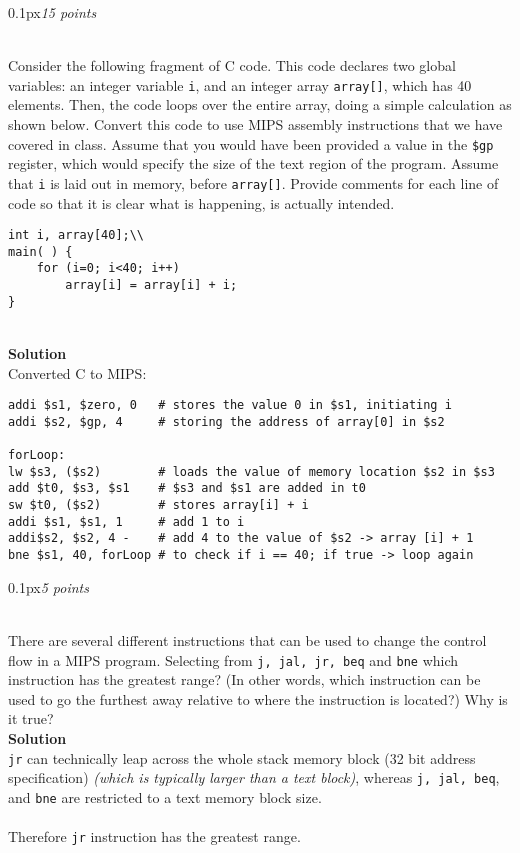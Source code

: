 \documentclass[11pt]{article}
\newcommand{\problem}[2]{\begin{adjustwidth}{0.1px}\noindent \framebox[1.2\width]{\large Problem #1}\hfill \emph{#2} \end{adjustwidth} \bigskip\\}
\newcommand{\code}[1]{{\texttt{#1}}}
\begin{document}
\newpage
\problem{2}{15 points}
Consider the following fragment of C code. This code declares two global variables: an integer variable \code{i}, and an integer array \code{array[]}, which has 40 elements. Then, the code loops over the entire array, doing a simple calculation as shown below. Convert this code to use MIPS assembly instructions that we have covered in class. Assume that you would have been provided a value in the \code{\$gp} register, which would specify the size of the text region of the program. Assume that \code{i} is laid out in memory, before \code{array[]}. Provide comments for each line of code so that it is clear what is happening, is actually intended.
\begin{lstlisting}[style=c]
int i, array[40];\\
main( ) { 
	for (i=0; i<40; i++) 
    	array[i] = array[i] + i; 
} 
\end{lstlisting}
\bigskip \\
\textbf{Solution}\\
Converted C to MIPS:
\begin{lstlisting}[style=MIPS]
addi $s1, $zero, 0   # stores the value 0 in $s1, initiating i
addi $s2, $gp, 4     # storing the address of array[0] in $s2

forLoop:
lw $s3, ($s2)        # loads the value of memory location $s2 in $s3
add $t0, $s3, $s1    # $s3 and $s1 are added in t0
sw $t0, ($s2)        # stores array[i] + i
addi $s1, $s1, 1     # add 1 to i
addi$s2, $s2, 4 -    # add 4 to the value of $s2 -> array [i] + 1
bne $s1, 40, forLoop # to check if i == 40; if true -> loop again
\end{lstlisting}




\newpage
\problem{3}{5 points}
There are several different instructions that can be used to change the control flow in a MIPS program. Selecting from \code{j, jal, jr, beq} and \code{bne} which instruction has the greatest range? (In other words, which instruction can be used to go the furthest away relative to where the instruction is located?) Why is it true?
\bigskip \\
\textbf{Solution}\\
\code{jr} can technically leap across the whole stack memory block (32 bit address specification) \emph{(which is typically larger than a text block)}, whereas \code{j, jal, beq}, and \code{bne} are restricted to a text memory block size.
\\
\\
Therefore \code{jr} instruction has the greatest range.
\end{document}
